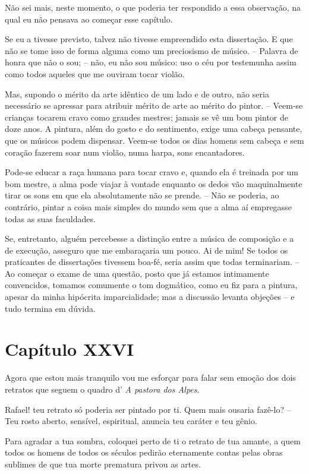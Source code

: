  Não sei mais, neste momento, o que poderia ter respondido a essa
observação, na qual eu não pensava ao começar esse capítulo.

 Se eu a tivesse previsto, talvez não tivesse empreendido esta
dissertação. E que não se tome isso de forma alguma como um preciosismo
de músico. -- Palavra de honra que não o sou; -- não, eu não sou
músico: uso o céu por testemunha assim como todos aqueles que me
ouviram tocar violão.

 Mas, supondo o mérito da arte idêntico de um lado e de outro, não seria
necessário se apressar para atribuir mérito de arte ao mérito do
pintor. -- Veem-se crianças tocarem cravo como grandes mestres; jamais
se vê um bom pintor de doze anos. A pintura, além do gosto e do
sentimento, exige uma cabeça pensante, que os músicos podem dispensar.
Veem-se todos os dias homens sem cabeça e sem coração fazerem soar num
violão, numa harpa, sons encantadores. 

 Pode-se educar a raça humana para tocar cravo e, quando ela é treinada
por um bom mestre, a alma pode viajar à vontade enquanto os dedos vão
maquinalmente tirar os sons em que ela absolutamente não se prende. --
Não se poderia, ao contrário, pintar a coisa mais simples do mundo sem
que a alma aí empregasse todas as suas faculdades.

 Se, entretanto, alguém percebesse a distinção entre a música de
composição e a de execução, asseguro que me embaraçaria um pouco. Ai de
mim! Se todos os praticantes de dissertações tivessem boa-fé, seria
assim que todas terminariam. -- Ao começar o exame de uma questão,
posto que já estamos intimamente convencidos, tomamos comumente o tom
dogmático, como eu fiz para a pintura, apesar da minha hipócrita
imparcialidade; mas a discussão levanta objeções -- e tudo termina em
dúvida.

\section*{Capítulo XXVI}

 Agora que estou mais tranquilo vou me esforçar para falar sem emoção
dos dois retratos que seguem o quadro d’ \textit{A pastora dos Alpes}. 

 Rafael! teu retrato só poderia ser pintado por ti. Quem mais ousaria
fazê-lo? -- Teu rosto aberto, sensível, espiritual, anuncia teu
caráter e teu gênio.

 Para agradar a tua sombra, coloquei perto de ti o retrato de tua
amante, a quem todos os homens de todos os séculos pedirão eternamente
contas pelas obras sublimes de que tua morte prematura privou as artes.


